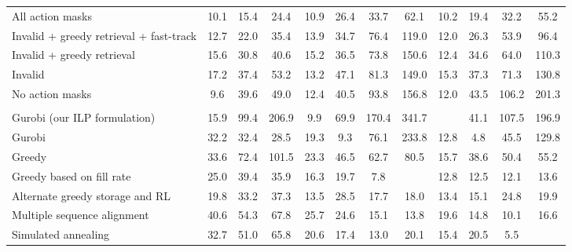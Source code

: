 \documentclass[11pt]{elsarticle}
\begin{document}
\begin{table}[H]
\begin{tabular}{l*{11}{S[detect-weight, mode=text,table-format=2.1,table-column-width=0.8cm]}}
\;\;All action masks  & 10.1 & 15.4 & 24.4 & 10.9 & 26.4 & 33.7 & 62.1 & 10.2 & 19.4 & 32.2 & 55.2 \\
\;\;Invalid + greedy retrieval + fast-track & 12.7 & 22.0 & 35.4 & 13.9 & 34.7 & 76.4 & 119.0 & 12.0 & 26.3 & 53.9 & 96.4 \\
\;\;Invalid + greedy retrieval & 15.6 & 30.8 & 40.6 & 15.2 & 36.5 & 73.8 & 150.6 & 12.4 & 34.6 & 64.0 & 110.3 \\
\;\;Invalid & 17.2 & 37.4 & 53.2 & 13.2 & 47.1 & 81.3 & 149.0 & 15.3 & 37.3 & 71.3 & 130.8 \\
\;\;No action masks  & 9.6 & 39.6 & 49.0 & 12.4 & 40.5 & 93.8 & 156.8 & 12.0 & 43.5 & 106.2 & 201.3 \\

\addlinespace
{} \\ \addlinespace

\;\;Gurobi (our ILP formulation) & 15.9 & 99.4 & 206.9 & 9.9 & 69.9 & 170.4 & 341.7 &  & 41.1 & 107.5 & 196.9 \\
\;\;Gurobi \citep{wu2021mathematical} & 32.2 & 32.4 & 28.5 & 19.3 & 9.3 & 76.1 & 233.8 & 12.8 & 4.8 & 45.5 & 129.8 \\
\;\;Greedy & 33.6 & 72.4 & 101.5 & 23.3 & 46.5 & 62.7 & 80.5 & 15.7 & 38.6 & 50.4 & 55.2 \\
\;\;Greedy based on fill rate & 25.0 & 39.4 & 35.9 & 16.3 & 19.7 & 7.8 &  & 12.8 & 12.5 & 12.1 & 13.6 \\
\;\;Alternate greedy storage and RL & 19.8 & 33.2 & 37.3 & 13.5 & 28.5 & 17.7 & 18.0 & 13.4 & 15.1 & 24.8 & 19.9 \\
\;\;Multiple sequence alignment & 40.6 & 54.3 & 67.8 & 25.7 & 24.6 & 15.1 & 13.8 & 19.6 & 14.8 & 10.1 & 16.6 \\
\;\;Simulated annealing & 32.7 & 51.0 & 65.8 & 20.6 & 17.4 & 13.0 & 20.1 & 15.4 & 20.5 & 5.5 &  \\

\bottomrule
\end{tabular}

\end{table}
\end{document}
